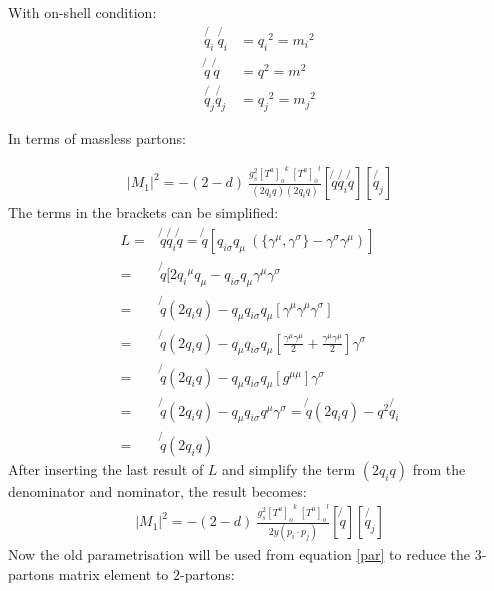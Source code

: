 With on-shell condition:
\begin{equation}
\begin{split}
\not{q_i}\: \not{q_i} &= {q_i}^2= {m_i}^2\\
\not{q} \: \not{q} &= {q}^2= {m}^2\\
\not{q_j}\not{q_j} &= {q_j}^2= {m_j}^2
\end{split}
\end{equation}

In terms of massless partons:

\begin{equation}
\begin{split}
|M_1|^2=-(2-d)\:\frac{g_s^2  {[T^a]_{o}}^k \: {[T^a]_o}^l }{(2q_i q)(2q_i q)}
[\not{q} \not{q_i} \not{q}]
[\not{q_j}]
\end{split}
\end{equation}
The terms in the brackets can be simplified:
\begin{equation}
\begin{split}
L=& \not{q} \not{q_i} \not{q} =\not{q}[{q_{i\sigma}} q_{\mu} \: (\lbrace{\gamma^{\mu}}, {\gamma^{\sigma}}\rbrace - {\gamma^{\sigma}}{\gamma^{\mu}})]\\ 
=& \not{q}[2{q_{i}}^{\mu} q_{\mu} - {q_{i\sigma}}q_{\mu}{\gamma^{\mu}}{\gamma^{\sigma}}\\
=& \not{q} (2q_i q)-q_{\mu}{q_{i\sigma}}q_{\mu}[{\gamma^{\mu}}{\gamma^{\mu}}{\gamma^{\sigma}}]\\
=& \not{q} (2q_i q)-q_{\mu}{q_{i\sigma}}q_{\mu}[\frac{{\gamma^{\mu}}{\gamma^{\mu}}}{2} +\frac{{\gamma^{\mu}}{\gamma^{\mu}}}{2}]{\gamma^{\sigma}}\\
=& \not{q} (2q_i q)-q_{\mu}{q_{i\sigma}}q_{\mu}[g^{{\mu}{\mu}}]{\gamma^{\sigma}}\\
=& \not{q} (2q_i q)-q_{\mu}{q_{i\sigma}}q^{\mu}{\gamma^{\sigma}}
=\not{q} (2q_i q)-q^2 \not{q_i}\\
=& \not{q} (2q_i q)
\end{split}
\end{equation}
After inserting the last result of $ L $ and simplify the term $ (2q_i q) $ from the denominator and nominator, the result becomes:
\begin{equation}
\begin{split}
|M_1|^2=-(2-d)\:\frac{g_s^2  {[T^a]_{o}}^k \: {[T^a]_o}^l }{2y(p_i \cdot p_j)}
[\not{q}]
[\not{q_j}]
\end{split}
\end{equation}
Now the old parametrisation will be used from equation \ref{par} to reduce the $ 3 $-partons matrix element to $ 2 $-partons:
